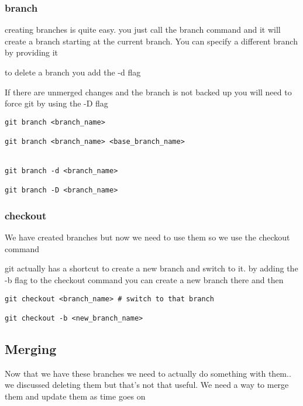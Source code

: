 \documentclass[a4paper]{article}
\begin{document}
\subsubsection*{branch}
\label{sec:orgd91dfe5}
\begin{notes}
creating branches is quite easy. you just call the branch command and it will
create a branch starting at the current branch. You can specify a different
branch by providing it

to delete a branch you add the -d flag

If there are unmerged changes and the branch is not backed up you will need to
force git by using the -D flag
\end{notes}

\begin{verbatim}
git branch <branch_name>

git branch <branch_name> <base_branch_name>


git branch -d <branch_name>

git branch -D <branch_name>
\end{verbatim}
\subsubsection*{checkout}
\label{sec:org26d3591}
\begin{notes}
We have created branches but now we need to use them so we use the checkout
command

git actually has a shortcut to create a new branch and switch to it. by adding
the -b flag to the checkout command you can create a new branch there and then
\end{notes}

\begin{verbatim}
git checkout <branch_name> # switch to that branch

git checkout -b <new_branch_name>
\end{verbatim}
\subsection*{Merging}
\label{sec:org6d05186}
\begin{notes}
Now that we have these branches we need to actually do something with them.. we
discussed deleting them but that's not that useful. We need a way to merge them
and update them as time goes on
\end{notes}
\end{document}
